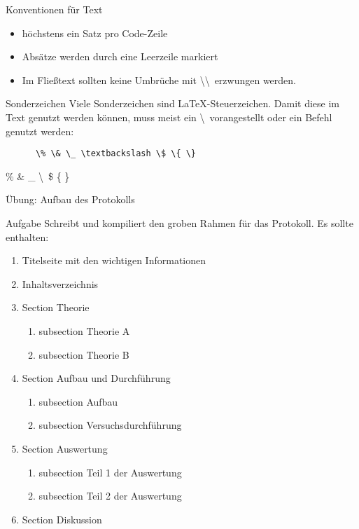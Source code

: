 \begin{frame}[fragile]{Konventionen für Text}
  \begin{itemize}
    \item höchstens ein Satz pro Code-Zeile
    \item Absätze werden durch eine Leerzeile markiert
    \item Im Fließtext sollten keine Umbrüche mit \textbackslash\textbackslash\  erzwungen werden.
  \end{itemize}
  \begin{alertblock}{Sonderzeichen}
    Viele Sonderzeichen sind \LaTeX-Steuerzeichen.
    Damit diese im Text genutzt werden können, muss meist ein \textbackslash\ vorangestellt oder ein Befehl genutzt werden:
    \begin{center}
      \begin{lstlisting}
      \% \& \_ \textbackslash \$ \{ \}
      \end{lstlisting}
      \% \& \_ \textbackslash\ \$ \{ \}
    \end{center}
  \end{alertblock}
\end{frame}

\begin{frame}{Übung: Aufbau des Protokolls}
  \begin{block}{Aufgabe}
    Schreibt und kompiliert den groben Rahmen für das Protokoll.
    Es sollte enthalten:
    \begin{enumerate}
      \item Titelseite mit den wichtigen Informationen
      \item Inhaltsverzeichnis
      \item Section Theorie
        \begin{enumerate}
          \item subsection Theorie A
          \item subsection Theorie B
        \end{enumerate}
      \item Section Aufbau und Durchführung
        \begin{enumerate}
          \item subsection Aufbau
          \item subsection Versuchsdurchführung
        \end{enumerate}
      \item Section Auswertung
        \begin{enumerate}
          \item subsection Teil 1 der Auswertung
          \item subsection Teil 2 der Auswertung
        \end{enumerate}
      \item Section Diskussion
    \end{enumerate}
  \end{block}
\end{frame}

